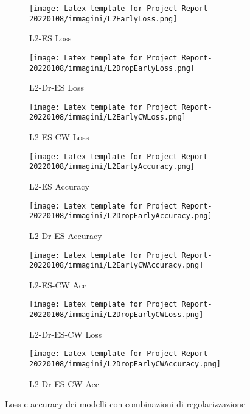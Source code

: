 \begin{figure}[h!]
     \centering
    \begin{subfigure}[b]{0.32\textwidth}
         \centering
         \texttt{[image: Latex template for Project Report-20220108/immagini/L2EarlyLoss.png]}
         \caption{L2-ES Loss}
         \label{fig:L2ESLoss}
     \end{subfigure}
     \hfill
     \begin{subfigure}[b]{0.32\textwidth}
         \centering
         \texttt{[image: Latex template for Project Report-20220108/immagini/L2DropEarlyLoss.png]}
         \caption{L2-Dr-ES Loss}
         \label{fig:L2DropESLoss}
     \end{subfigure}
     \hfill
     \begin{subfigure}[b]{0.32\textwidth}
         \centering
         \texttt{[image: Latex template for Project Report-20220108/immagini/L2EarlyCWLoss.png]}
         \caption{L2-ES-CW Loss}
         \label{fig:L2ESCWLoss}
     \end{subfigure}
     
      \begin{subfigure}[b]{0.32\textwidth}
         \centering
         \texttt{[image: Latex template for Project Report-20220108/immagini/L2EarlyAccuracy.png]}
         \caption{L2-ES Accuracy}
         \label{fig:L2ESAcc}
     \end{subfigure}
     \hfill
     \begin{subfigure}[b]{0.32\textwidth}
         \centering
         \texttt{[image: Latex template for Project Report-20220108/immagini/L2DropEarlyAccuracy.png]}
         \caption{L2-Dr-ES Accuracy}
         \label{fig:L2DropESAcc}
     \end{subfigure}
     \hfill
     \begin{subfigure}[b]{0.32\textwidth}
         \centering
         \texttt{[image: Latex template for Project Report-20220108/immagini/L2EarlyCWAccuracy.png]}
         \caption{L2-ES-CW Acc}
         \label{fig:L2ESCWAcc}
     \end{subfigure}
     
     \begin{subfigure}[b]{0.32\textwidth}
         \centering
         \texttt{[image: Latex template for Project Report-20220108/immagini/L2DropEarlyCWLoss.png]}
         \caption{L2-Dr-ES-CW Loss}
         \label{fig:L2DropESCWLoss}
     \end{subfigure}
     \hspace{2em}
     \begin{subfigure}[b]{0.32\textwidth}
         \centering
         \texttt{[image: Latex template for Project Report-20220108/immagini/L2DropEarlyCWAccuracy.png]}
         \caption{L2-Dr-ES-CW Acc}
         \label{fig:L2DropESCWAcc}
     \end{subfigure}
     
     \caption{Loss e accuracy dei modelli con combinazioni di regolarizzazione}
     \label{fig:secondiModelli}
\end{figure} 

